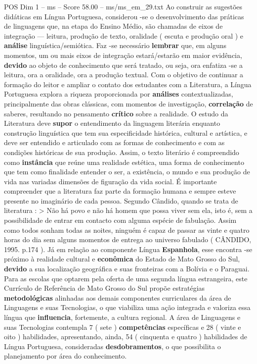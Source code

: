 \begin{textsample}{POS Dim 1 – ms – Score 58.00 – ms/ms\_em\_29.txt}
Ao construir as sugestões didáticas em Língua Portuguesa, considerou -se o desenvolvimento das práticas de linguagens que, na etapa do Ensino Médio, são chamadas de eixos de integração — leitura, produção de texto, oralidade ( escuta e produção oral ) e \textbf{análise} linguística/semiótica.
Faz -se necessário \textbf{lembrar} que, em alguns momentos, um ou mais eixos de integração estará/estarão em maior evidência, \textbf{devido} ao objeto de conhecimento que será tratado, ou seja, ora enfatiza -se a leitura, ora a oralidade, ora a produção textual.
Com o objetivo de continuar a formação do leitor e ampliar o contato dos estudantes com a Literatura, a Língua Portuguesa explora a riqueza proporcionada por \textbf{análises} contextualizadas, principalmente das obras clássicas, com momentos de investigação, \textbf{correlação} de saberes, resultando no pensamento \textbf{crítico} sobre a realidade.
O estudo da Literatura deve \textbf{supor} o entendimento da linguagem literária enquanto construção linguística que tem sua especificidade histórica, cultural e artística, e deve ser entendido e articulado com as formas de conhecimento e com as condições históricas de sua produção.
Assim, o texto literário é compreendido como \textbf{instância} que reúne uma realidade estética, uma forma de conhecimento que tem como finalidade entender o ser, a existência, o mundo e sua produção de vida nas variadas dimensões de figuração da vida social.
É importante compreender que a literatura faz parte da formação humana e sempre esteve presente no imaginário de cada pessoa.
Segundo Cândido, quando se trata de literatura : > Não há povo e não há homem que possa viver sem ela, isto é, sem a possibilidade de entrar em contacto com alguma espécie de fabulação.
Assim como todos sonham todas as noites, ninguém é capaz de passar as vinte e quatro horas do dia sem alguns momentos de entrega ao universo fabulado ( CÂNDIDO, 1995. p.174 ).
Já em relação ao componente Língua \textbf{Espanhola}, esse encontra -se próximo à realidade cultural e \textbf{econômica} do Estado de Mato Grosso do Sul, \textbf{devido} a sua localização geográfica e suas fronteiras com a Bolívia e o Paraguai.
Para as escolas que optarem pela oferta de uma segunda língua estrangeira, este Currículo de Referência de Mato Grosso do Sul propõe estratégias \textbf{metodológicas} alinhadas aos demais componentes curriculares da área de Linguagens e suas Tecnologias, o que viabiliza uma ação integrada e valoriza essa língua que \textbf{influencia}, fortemente, a cultura regional.
A área de Linguagens e suas Tecnologias contempla 7 ( sete ) \textbf{competências} específicas e 28 ( vinte e oito ) habilidades, apresentando, ainda, 54 ( cinquenta e quatro ) habilidades de Língua Portuguesa, consideradas \textbf{desdobramentos}, o que possibilita o planejamento por área do conhecimento.

\end{textsample}
